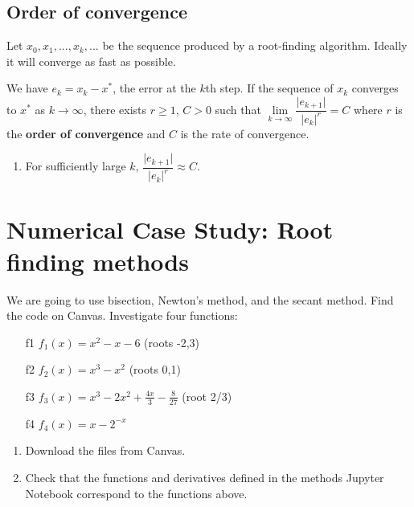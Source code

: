 \documentclass[12pt,letterpaper,noanswers]{exam}
\def\dsst{\displaystyle}
\begin{document}
\subsection*{Order of convergence}

\begin{tcolorbox}
Let $x_0, x_1, ..., x_k, ...$ be the sequence produced by a root-finding algorithm.  Ideally it will converge as fast as possible.

We have $e_k = x_k - x^*$, the error at the $k$th step.  If the sequence of $x_k$ converges to $x^*$ as $k\rightarrow\infty$, there exists $r\geq 1$, $C>0$ such that $\lim\limits_{k\rightarrow\infty}\dfrac{\vert e_{k+1}\vert}{\vert e_k\vert^r} = C$ where $r$ is the \textbf{order of convergence} and $C$ is the rate of convergence.
\end{tcolorbox}
\begin{enumerate}[resume=classQ]
\item For sufficiently large $k$, $\dfrac{\vert e_{k+1}\vert}{\vert e_k\vert^r} \approx C$.
\end{enumerate}

\eject
\section*{Numerical Case Study: Root finding methods}

We are going to use bisection, Newton's method, and the secant method.  Find the code on Canvas.  Investigate four functions:
\begin{enumerate}
\item[f1] $f_1(x) = x^2 - x - 6$ (roots -2,3)
\item[f2] $f_2(x) = x^3 - x^2$ (roots 0,1)
\item[f3] $\dsst{f_3(x) = x^3 - 2x^2 + \frac{4x}{3} - \frac{8}{27}}$ (root 2/3)
\item[f4] $f_4(x) = x - 2^{-x}$
\end{enumerate}
\begin{enumerate}[resume=classQ]
    \item Download the files from Canvas.
    \item Check that the functions and derivatives defined in the methods Jupyter Notebook correspond to the functions above.
\end{enumerate}
\end{document}
